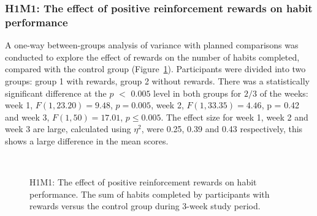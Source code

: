\subsubsection*{H1M1: The effect of positive reinforcement rewards on habit performance}

A one-way between-groups analysis of variance with planned comparisons was conducted to explore the effect of rewards on the number of habits completed, compared with the control group (Figure~\ref{fig:m1_h1}). Participants were divided into two groups: group 1 with rewards, group 2 without rewards. There was a statistically significant difference at the $p$ $<$ $0.005$ level in both groups for $2$$/$$3$ of the weeks: week 1, $F(1,23.20) = 9.48$, $p = 0.005$, week 2, $F(1,33.35) = 4.46$, p = 0.42 and week 3, $F(1,50) = 17.01$, $p\leq 0.005$. The effect size for week 1, week 2 and week 3 are large, calculated using $\eta^{2}$, were 0.25, 0.39 and 0.43 respectively, this shows a large difference in the mean scores.


\begin{figure}[H]
\centering
  \caption{H1M1: The effect of positive reinforcement rewards on habit performance. The sum of habits completed by participants with rewards versus the control group during 3-week study period.}~\label{fig:m1_h1}
\end{figure}

